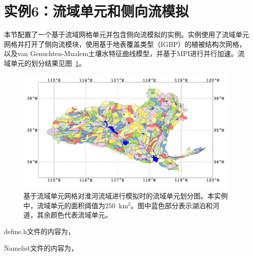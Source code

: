 \documentclass[a4paper,12pt,twoside]{article}
\begin{document}
\section{实例6：流域单元和侧向流模拟}

本节配置了一个基于流域网格单元并包含侧向流模拟的实例。实例使用了流域单元网格并打开了侧向流模块，使用基于地表覆盖类型（IGBP）的植被结构次网格，以及van Genuchten-Mualem土壤水特征曲线模型，并基于MPI进行并行加速。流域单元的划分结果见图~\ref{fig:fig_huaihe}。

\begin{figure}[htpb]
    \centering
    \includegraphics[width=\textwidth]{figures/CatchmentMesh_Huaihe.pdf}
    \caption{基于流域单元网格对淮河流域进行模拟时的流域单元划分图。本实例中，流域单元的面积阈值为250~$\mathrm{km^2}$。图中蓝色部分表示湖泊和河道，其余颜色代表流域单元。}
    \label{fig:fig_huaihe}
\end{figure}

define.h文件的内容为，


Namelist文件的内容为，

\end{document}
